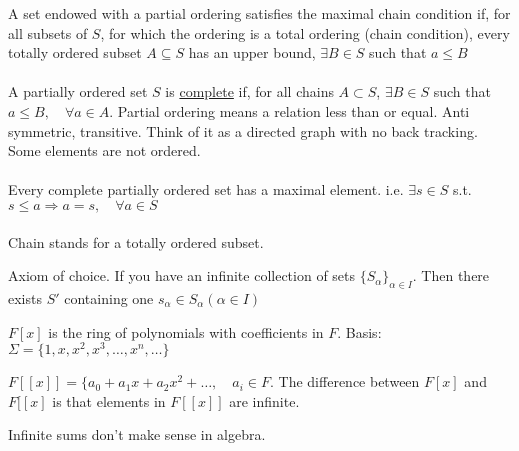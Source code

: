 \documentclass[class=scrartcl, crop=false]{standalone}
\begin{document}
\begin{definition}
  A set endowed with a partial ordering satisfies the maximal chain condition if, for all subsets of $S$, for which the ordering is a total ordering (chain condition), every totally ordered subset $A \subseteq S$ has an upper bound, $\exists B \in S$ such that $a \leq B$ 
  \\\\
  A partially ordered set $S$ is \ul{complete} if, for all chains $A \subset S$, $\exists B \in S$ such that $a \leq B, \quad \forall a \in A$.
  Partial ordering means a relation less than or equal. Anti symmetric, transitive. Think of it as a directed graph with no back tracking. Some elements are not ordered.
  \\\\
  Every complete partially ordered set has a maximal element. i.e. $\exists s \in S$ s.t. $s \leq a \Rightarrow a = s, \quad \forall a \in S$
  \\\\
  Chain stands for a totally ordered subset.
\end{definition} 

Axiom of choice. If you have an infinite collection of sets $\{S_\alpha\}_{\alpha \in I}$. Then there exists  $S'$ containing one $s_{\alpha} \in S_{\alpha}(\alpha \in I)$

\begin{example}
  $F[x]$ is the ring of polynomials with coefficients in $F$. Basis: $\Sigma = \{1, x, x^2, x^3, \dots, x^n, \dots\}$ %
\end{example} 
\begin{example}
  $F[[x]] = \{a_0 + a_1x + a_2x^2 + \dots, \quad a_i \in F$. The difference between $F[x]$ and $F[[x]$ is that  elements in $F[[x]]$ are infinite.
\end{example} 

Infinite sums don't make sense in algebra.
\end{document}
